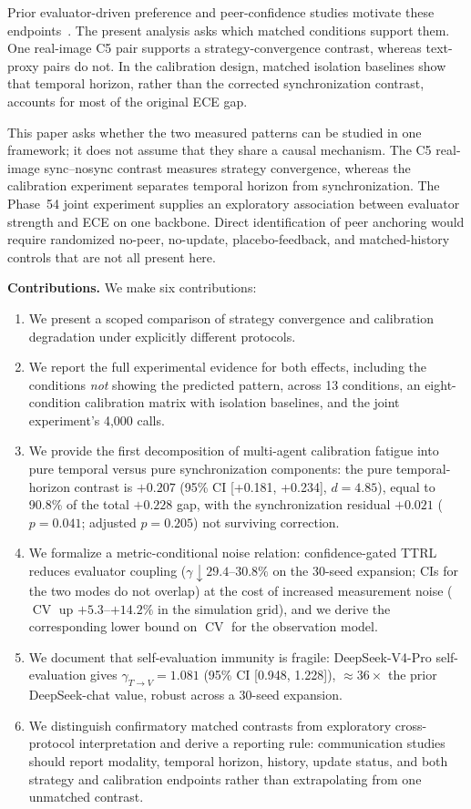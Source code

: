 \documentclass[11pt]{article}
\DeclareMathOperator{\CV}{CV}
\begin{document}
Prior evaluator-driven preference and peer-confidence studies motivate these endpoints~\cite{liu2026impossible,liu2026mmepc,liu2026calibration}. The present analysis asks which matched conditions support them. One real-image C5 pair supports a strategy-convergence contrast, whereas text-proxy pairs do not. In the calibration design, matched isolation baselines show that temporal horizon, rather than the corrected synchronization contrast, accounts for most of the original ECE gap.

This paper asks whether the two measured patterns can be studied in one framework; it does not assume that they share a causal mechanism. The C5 real-image sync--nosync contrast measures strategy convergence, whereas the calibration experiment separates temporal horizon from synchronization. The Phase~54 joint experiment supplies an exploratory association between evaluator strength and ECE on one backbone. Direct identification of peer anchoring would require randomized no-peer, no-update, placebo-feedback, and matched-history controls that are not all present here.

\textbf{Contributions.} We make six contributions:
\begin{enumerate}[leftmargin=*,nosep]
 \item We present a scoped comparison of strategy convergence and calibration degradation under explicitly different protocols.
 \item We report the full experimental evidence for both effects, including the conditions \textit{not} showing the predicted pattern, across 13 conditions, an eight-condition calibration matrix with isolation baselines, and the joint experiment's 4,000 calls.
 \item We provide the first decomposition of multi-agent calibration fatigue into pure temporal versus pure synchronization components: the pure temporal-horizon contrast is $+0.207$ (95\% CI [+0.181, +0.234], $d{=}4.85$), equal to 90.8\% of the total $+0.228$ gap, with the synchronization residual $+0.021$ ($p{=}0.041$; adjusted $p{=}0.205$) not surviving correction.
 \item We formalize a metric-conditional noise relation: confidence-gated TTRL reduces evaluator coupling ($\gamma \downarrow 29.4$--$30.8\%$ on the 30-seed expansion; CIs for the two modes do not overlap) at the cost of increased measurement noise ($\CV$ up $+5.3$--$+14.2\%$ in the simulation grid), and we derive the corresponding lower bound on $\CV$ for the observation model.
 \item We document that self-evaluation immunity is fragile: DeepSeek-V4-Pro self-evaluation gives $\gamma_{T\to V}{=}1.081$ (95\% CI [0.948, 1.228]), $\approx 36\times$ the prior DeepSeek-chat value, robust across a 30-seed expansion.
 \item We distinguish confirmatory matched contrasts from exploratory cross-protocol interpretation and derive a reporting rule: communication studies should report modality, temporal horizon, history, update status, and both strategy and calibration endpoints rather than extrapolating from one unmatched contrast.
\end{enumerate}
\end{document}
